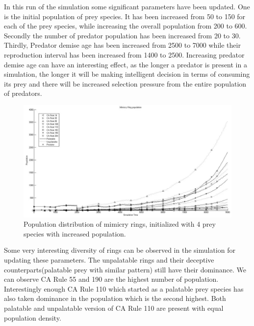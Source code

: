 
In this run of the simulation some significant parameters have been updated. One is the initial population of prey species. It has been increased from 50 to 150 for each of the prey species, while increasing the overall population from 200 to 600. Secondly the number of predator population has been increased from 20 to 30. Thirdly, Predator demise age has been increased from 2500 to 7000 while their reproduction interval has been increased from 1400 to 2500. Increasing predator demise age can have an interesting effect, as the longer a predator is present in a simulation, the longer it will be making intelligent decision in terms of consuming its prey and there will be increased selection pressure from the entire population of predators. 

\begin{figure}[H]
	\centering
	\includegraphics[scale=0.40]{images/simTime9K-4MorePrey}
	\caption[Population distribution of mimicry rings (4 prey species, increased population)]{Population distribution of mimicry rings, initialized with 4 prey species with increased population.}
	\label{fig:plot-4-more-prey}
\end{figure}

Some very interesting diversity of rings can be observed in the simulation for updating these parameters. The unpalatable rings and their deceptive counterparts(palatable prey with similar pattern) still have their dominance. We can observe CA Rule 55 and 190 are the highest number of population. Interestingly enough CA Rule 110 which started as a palatable prey species has also taken dominance in the population which is the second highest. Both palatable and unpalatable version of CA Rule 110 are present with equal population density.

